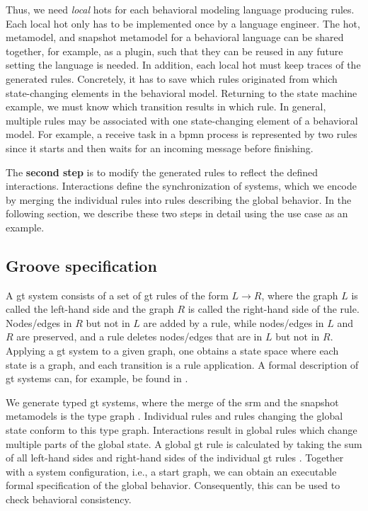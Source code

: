\documentclass{jot}
\begin{document}
Thus, we need \textit{local} \gls*{hot}s for each behavioral modeling language producing rules.
Each local \gls*{hot} only has to be implemented once by a language engineer.
The \gls*{hot}, metamodel, and snapshot metamodel for a behavioral language can be shared together, for example, as a plugin, such that they can be reused in any future setting the language is needed.
In addition, each local \gls*{hot} must keep traces of the generated rules.
Concretely, it has to save which rules originated from which state-changing elements in the behavioral model.
Returning to the state machine example, we must know which transition results in which rule.
In general, multiple rules may be associated with one state-changing element of a behavioral model.
For example, a receive task in a \gls*{bpmn} process is represented by two rules since it starts and then waits for an incoming message before finishing.

The \textbf{second step} is to modify the generated rules to reflect the defined interactions.
Interactions define the synchronization of systems, which we encode by merging the individual rules into rules describing the global behavior.
In the following section, we describe these two steps in detail using the use case as an example.

\subsection{Groove specification} 
A \gls*{gt} system consists of a set of \gls*{gt} rules of the form $L \to R$, where the graph $L$ is called the left-hand side and the graph $R$ is called the right-hand side of the rule.
Nodes/edges in $R$ but not in $L$ are added by a rule, while nodes/edges in $L$ and $R$ are preserved, and a rule deletes nodes/edges that are in $L$ but not in $R$.
Applying a \gls*{gt} system to a given graph, one obtains a state space where each state is a graph, and each transition is a rule application.
A formal description of \gls*{gt} systems can, for example, be found in \cite{ehrigFundamentalsAlgebraicGraph2006}. %

We generate typed \gls*{gt} systems, where the merge of the \gls*{srm} and the snapshot metamodels is the type graph \cite{krauterArtifactsBehavioralConsistency2023}.
Individual rules and rules changing the global state conform to this type graph.
Interactions result in global rules which change multiple parts of the global state.
A global \gls*{gt} rule is calculated by taking the sum of all left-hand sides and right-hand sides of the individual \gls*{gt} rules \cite[Definition 3.2.7]{baldanConcurrentSemanticsAlgebraic1999}.
Together with a system configuration, i.e., a start graph, we can obtain an executable formal specification of the global behavior.
Consequently, this can be used to check behavioral consistency.
\end{document}
